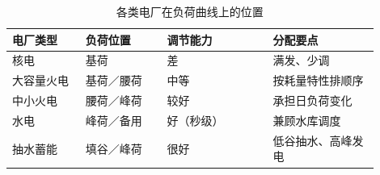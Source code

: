 \begin{table}[htbp]
  \centering
  \caption{各类电厂在负荷曲线上的位置}
  \small
  \begin{tabular}{@{}p{0.18\linewidth}p{0.20\linewidth}p{0.26\linewidth}p{0.26\linewidth}@{}}
    \toprule
    电厂类型 & 负荷位置 & 调节能力 & 分配要点 \\
    \midrule
    核电 & 基荷 & 差 & 满发、少调 \\
    大容量火电 & 基荷／腰荷 & 中等 & 按耗量特性排顺序 \\
    中小火电 & 腰荷／峰荷 & 较好 & 承担日负荷变化 \\
    水电 & 峰荷／备用 & 好（秒级） & 兼顾水库调度 \\
    抽水蓄能 & 填谷／峰荷 & 很好 & 低谷抽水、高峰发电 \\
    \bottomrule
  \end{tabular}
\end{table}

